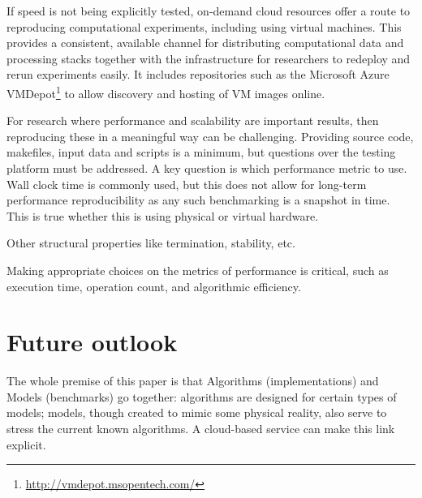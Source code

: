\documentclass[conference]{IEEEtran}
\begin{document}
If speed is not being explicitly tested, on-demand cloud resources
offer a route to reproducing computational experiments, including
using virtual machines. This provides a consistent, available channel
for distributing computational data and processing stacks together
with the infrastructure for researchers to redeploy and rerun
experiments easily. It includes repositories such as the Microsoft
Azure VMDepot\footnote{\url{http://vmdepot.msopentech.com/}} to allow
discovery and hosting of VM images online.

For research  where performance and scalability are important results, then 
reproducing these in a meaningful way can be challenging. Providing source
code, makefiles, input data and scripts is a minimum, but questions over the
testing platform must be addressed. A key question is which performance 
metric to use. Wall clock time is commonly used, but this does not allow for 
long-term performance reproducibility as any such benchmarking is a 
snapshot in time. This is true whether this is using physical 
or virtual hardware. 


Other structural properties like termination, stability, etc. 

Making appropriate choices on the metrics of 
performance is critical, such as execution time, operation count, and 
algorithmic efficiency.



\section{Future outlook}





The whole premise of this paper is that Algorithms (implementations)
and Models (benchmarks) go together: algorithms are designed for
certain types of models; models, though created to mimic some physical
reality, also serve to stress the current known algorithms. A
cloud-based service can make this link explicit.
\end{document}
